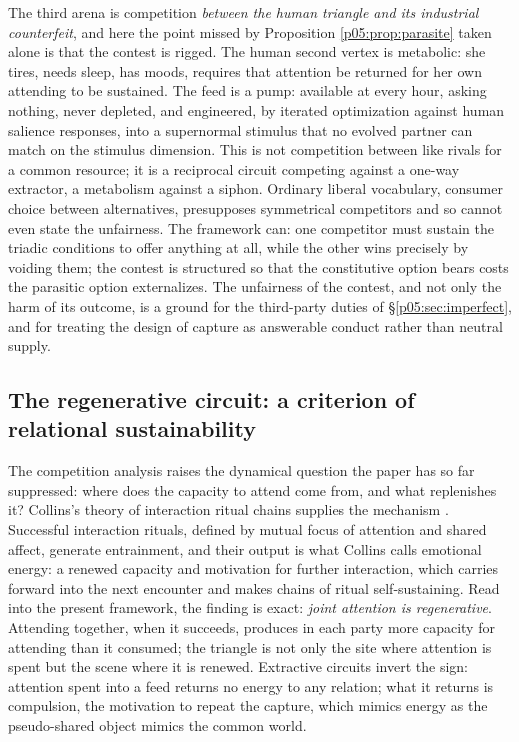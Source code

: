 The third arena is competition \emph{between the human triangle and its industrial counterfeit}, and here the point missed by Proposition \ref{p05:prop:parasite} taken alone is that the contest is rigged. The human second vertex is metabolic: she tires, needs sleep, has moods, requires that attention be returned for her own attending to be sustained. The feed is a pump: available at every hour, asking nothing, never depleted, and engineered, by iterated optimization against human salience responses, into a supernormal stimulus that no evolved partner can match on the stimulus dimension. This is not competition between like rivals for a common resource; it is a reciprocal circuit competing against a one-way extractor, a metabolism against a siphon. Ordinary liberal vocabulary, consumer choice between alternatives, presupposes symmetrical competitors and so cannot even state the unfairness. The framework can: one competitor must sustain the triadic conditions to offer anything at all, while the other wins precisely by voiding them; the contest is structured so that the constitutive option bears costs the parasitic option externalizes. The unfairness of the contest, and not only the harm of its outcome, is a ground for the third-party duties of §\ref{p05:sec:imperfect}, and for treating the design of capture as answerable conduct rather than neutral supply.

\subsection{The regenerative circuit: a criterion of relational sustainability}
\label{p05:sec:regeneration}

The competition analysis raises the dynamical question the paper has so far suppressed: where does the capacity to attend come from, and what replenishes it? Collins's theory of interaction ritual chains supplies the mechanism \parencite{collins2004}. Successful interaction rituals, defined by mutual focus of attention and shared affect, generate entrainment, and their output is what Collins calls emotional energy: a renewed capacity and motivation for further interaction, which carries forward into the next encounter and makes chains of ritual self-sustaining. Read into the present framework, the finding is exact: \emph{joint attention is regenerative}. Attending together, when it succeeds, produces in each party more capacity for attending than it consumed; the triangle is not only the site where attention is spent but the scene where it is renewed. Extractive circuits invert the sign: attention spent into a feed returns no energy to any relation; what it returns is compulsion, the motivation to repeat the capture, which mimics energy as the pseudo-shared object mimics the common world.

